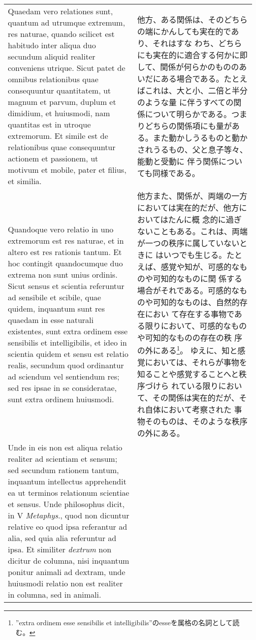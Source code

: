 \documentclass[10pt]{jsarticle} %
\begin{document}
\begin{longtable}{p{21em}p{21em}}
\\

Quaedam vero relationes sunt, quantum ad utrumque extremum, res
naturae, quando scilicet est habitudo inter aliqua duo secundum
aliquid realiter conveniens utrique. Sicut patet de omnibus
relationibus quae consequuntur quantitatem, ut magnum et parvum,
duplum et dimidium, et huiusmodi, nam quantitas est in utroque
extremorum. Et simile est de relationibus quae consequuntur actionem
et passionem, ut motivum et mobile, pater et filius, et similia.


&

他方、ある関係は、そのどちらの端にかんしても実在的であり、それはすな
わち、どちらにも実在的に適合する何かに即して、関係が何らかのもののあ
いだにある場合である。たとえばこれは、大と小、二倍と半分のような量
に伴うすべての関係について明らかである。つまりどちらの関係項にも量があ
る。また動かしうるものと動かされうるもの、父と息子等々、能動と受動に
伴う関係についても同様である。

\\



Quandoque vero relatio in uno extremorum est res naturae, et in altero
est res rationis tantum. Et hoc contingit quandocumque duo extrema non
sunt unius ordinis. Sicut sensus et scientia referuntur ad sensibile
et scibile, quae quidem, inquantum sunt res quaedam in esse naturali
existentes, sunt extra ordinem esse sensibilis et intelligibilis, et
ideo in scientia quidem et sensu est relatio realis, secundum quod
ordinantur ad sciendum vel sentiendum res; sed res ipsae in se
consideratae, sunt extra ordinem huiusmodi. 

&

他方また、関係が、両端の一方においては実在的だが、他方においてはたんに概
 念的に過ぎないこともある。これは、両端が一つの秩序に属していないときに
 はいつでも生じる。たとえば、感覚や知が、可感的なものや可知的なものに関
 係する場合がそれである。可感的なものや可知的なものは、自然的存在におい
 て存在する事物である限りにおいて、可感的なものや可知的なものの存在の秩
 序の外にある\footnote{''extra ordinem esse sensibilis et
 intelligibilis''のesseを属格の名詞として読む。}。
ゆえに、知と感覚においては、それらが事物を知ることや感覚することへと秩序づけら
 れている限りにおいて、その関係は実在的だが、それ自体において考察された
 事物そのものは、そのような秩序の外にある。

\\

Unde in eis non est aliqua
relatio realiter ad scientiam et sensum; sed secundum rationem tantum,
inquantum intellectus apprehendit ea ut terminos relationum scientiae
et sensus. Unde philosophus dicit, in V {\itshape Metaphys}., quod non
dicuntur relative eo quod ipsa referantur ad alia, sed quia alia
referuntur ad ipsa. Et similiter {\itshape dextrum} non dicitur de
columna, nisi inquantum ponitur animali ad dextram, unde huiusmodi
relatio non est realiter in columna, sed in animali.


\end{longtable}
\end{document}

